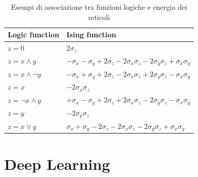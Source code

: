 \documentclass[a4paper]{article}
\begin{document}
\begin{table}[H]
\begin{tabular}{l|l}
Logic function & Ising function\\
\hline
$z = 0$        & 2$\sigma_z$                                                                                   \\
$z = x \wedge y$    & $-\sigma_x - \sigma_y + 2\sigma_z - 2\sigma_x\sigma_z - 2\sigma_y\sigma_z + \sigma_x\sigma_y$ \\
$z = x \wedge \lnot y$   & $-\sigma_x + \sigma_y + 2\sigma_z - 2\sigma_x\sigma_z + 2\sigma_y\sigma_z - \sigma_x\sigma_y$ \\
$z = x$        & $-2\sigma_x\sigma_z$                                                                          \\
$z = \lnot x \wedge y$   & $+\sigma_x - \sigma_y + 2\sigma_z + 2\sigma_x\sigma_z - 2\sigma_y\sigma_z - \sigma_x\sigma_y$ \\
$ z = y$       & $-2\sigma_y\sigma_z$                                                                           \\
$z = x \vee y $   & $\sigma_x + \sigma_y - 2\sigma_z - 2\sigma_x\sigma_z - 2\sigma_y\sigma_z + \sigma_x\sigma_y$  \\

\end{tabular}
\centering
\caption{Esempi di associazione tra funzioni logiche e energia dei reticoli \cite{quantumannealing}}
\end{table}
\section{Deep Learning}
\end{document}
